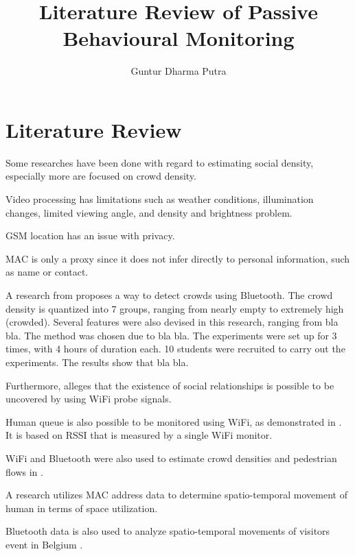 \documentclass{article}
\begin{document}
\title{Literature Review of Passive Behavioural Monitoring}
\author{Guntur Dharma Putra}

\maketitle


\section{Literature Review}
Some researches have been done with regard to estimating social density, especially more are focused on crowd density.

Video processing has limitations such as weather conditions, illumination changes, limited viewing angle, and density and brightness problem. 

GSM location has an issue with privacy\cite{thesis017}.

MAC is only a proxy since it does not infer directly to personal information, such as name or contact.

A research from \cite{thesis008} proposes a way to detect crowds using Bluetooth. The crowd density is quantized into 7 groups, ranging from nearly empty to extremely high (crowded). Several features were also devised in this research, ranging from bla bla. 
The method was chosen due to bla bla.
The experiments were set up for 3 times, with 4 hours of duration each. 10 students were recruited to carry out the experiments.
The results show that bla bla.

Furthermore, \cite{thesis014} alleges that the existence of social relationships is possible to be uncovered by using WiFi probe signals.

Human queue is also possible to be monitored using WiFi, as demonstrated in \cite{thesis012}. It is based on RSSI that is measured by a single WiFi monitor.

WiFi and Bluetooth were also used to estimate crowd densities and pedestrian flows in \cite{thesis011}.

A research \cite{thesis017} utilizes MAC address data to determine spatio-temporal movement of human in terms of space utilization.

Bluetooth data is also used to analyze spatio-temporal movements of visitors event in Belgium \cite{thesis016}.
\end{document}
